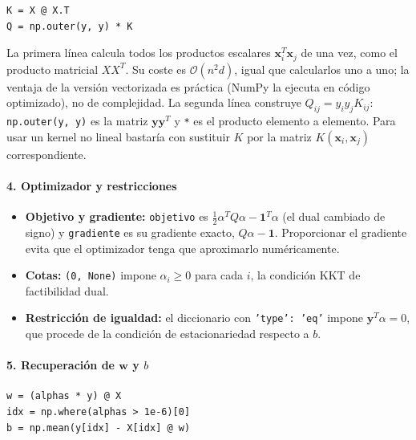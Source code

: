 \documentclass[12pt, a4paper]{article}
\begin{document}
\begin{lstlisting}
K = X @ X.T
Q = np.outer(y, y) * K
\end{lstlisting}

\noindent La primera línea calcula todos los productos escalares $\mathbf{x}_i^T\mathbf{x}_j$ de una vez, como el producto matricial $XX^T$. Su coste es $\mathcal{O}(n^2 d)$, igual que calcularlos uno a uno; la ventaja de la versión vectorizada es práctica (NumPy la ejecuta en código optimizado), no de complejidad. La segunda línea construye $Q_{ij} = y_i y_j K_{ij}$: \texttt{np.outer(y, y)} es la matriz $\mathbf{y}\mathbf{y}^T$ y \texttt{*} es el producto elemento a elemento. Para usar un kernel no lineal bastaría con sustituir $K$ por la matriz $K(\mathbf{x}_i, \mathbf{x}_j)$ correspondiente.

\paragraph{4. Optimizador y restricciones}

\begin{itemize}
    \item \textbf{Objetivo y gradiente:} \texttt{objetivo} es $\frac12\alpha^TQ\alpha - \mathbf{1}^T\alpha$ (el dual cambiado de signo) y \texttt{gradiente} es su gradiente exacto, $Q\alpha - \mathbf{1}$. Proporcionar el gradiente evita que el optimizador tenga que aproximarlo numéricamente.
    \item \textbf{Cotas:} \texttt{(0, None)} impone $\alpha_i \geq 0$ para cada $i$, la condición KKT de factibilidad dual.
    \item \textbf{Restricción de igualdad:} el diccionario con \texttt{'type': 'eq'} impone $\mathbf{y}^T\alpha = 0$, que procede de la condición de estacionariedad respecto a $b$.
\end{itemize}

\paragraph{5. Recuperación de $\mathbf{w}$ y $b$}

\begin{lstlisting}
w = (alphas * y) @ X
idx = np.where(alphas > 1e-6)[0]
b = np.mean(y[idx] - X[idx] @ w)
\end{lstlisting}
\end{document}
